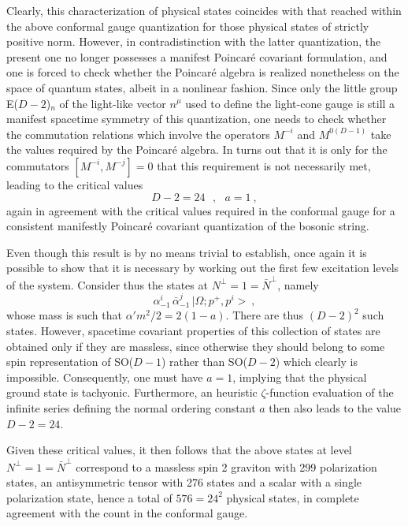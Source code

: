 \documentclass[a4paper,11pt]{article}
\begin{document}
Clearly, this characterization of physical states coincides with that
reached within the above conformal gauge quantization for those physical
states of strictly positive norm. However, in contradistinction with the
latter quantization, the present one no longer possesses a manifest Poincar\'e
covariant formulation, and one is forced to check whether the Poincar\'e
algebra is rea\-li\-zed nonetheless on the space of quantum states, albeit in
a nonlinear fashion. Since only the little group E($D-2$)$_n$ of the 
light-like vector $n^\mu$ used to define the light-cone gauge is still a 
manifest spacetime symmetry of this quantization, one needs to check whether 
the commutation relations which involve the operators $M^{-i}$ and $M^{0(D-1)}$
take the values required by the Poincar\'e algebra. In turns out that it is
only for the commutators $[M^{-i},M^{-j}]=0$ that this requirement is
not necessarily met, leading to the critical values\cite{Pol,GSW,JG10}
\begin{equation}
D-2=24\ \ \ ,\ \ \ a=1\ ,
\end{equation}
again in agreement with the critical values required in the conformal
gauge for a consistent manifestly Poincar\'e covariant quantization of
the bosonic string.

Even though this result is by no means trivial to establish, once
again it is possible to show that it is necessary by working out the
first few excitation levels of the system. Consider thus the states
at $N^\perp=1=\bar{N}^\perp$, namely
\begin{equation}
\alpha^i_{-1}\,\bar{\alpha}^j_{-1}\,|\Omega;p^+,p^i>\ ,
\end{equation}
whose mass is such that $\alpha' m^2/2=2(1-a)$. There are thus $(D-2)^2$
such states. However, spacetime covariant properties of this collection
of states are obtained only if they are massless, since otherwise they
should belong to some spin representation of SO($D-1$) rather than SO($D-2$)
which clearly is impossible. Consequently, one must have $a=1$, implying 
that the physical ground state is tachyonic. Furthermore, an heuristic 
$\zeta$-function evaluation of the infinite series defining the normal 
ordering constant $a$ then also leads to the value $D-2=24$. 

Given these critical values, it then follows that the above states at level 
$N^\perp=1=\bar{N}^\perp$ correspond to a massless spin 2 graviton with 
299 polarization states, an antisymmetric tensor with 276 states and a 
scalar with a single polarization state, hence a total of $576=24^2$ 
physical states, in complete agreement with the count in the conformal gauge.
\end{document}
